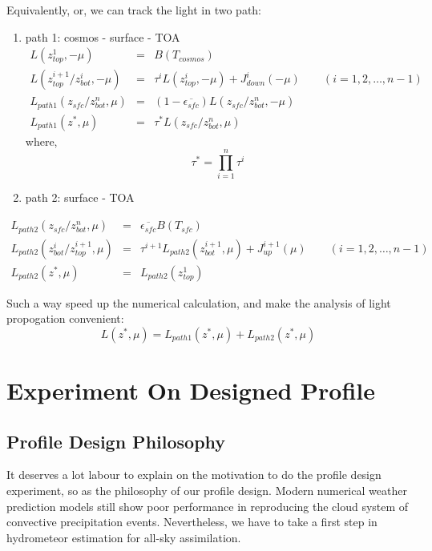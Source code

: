 \documentclass[a4paper]{report}
\begin{document}
Equivalently, or, we can track the light in two path:

\begin{enumerate} \label{eq:path1}
    \item path 1: cosmos - surface - TOA
    \begin{eqnarray}
        L(z_{top}^{1}, -\mu) & = & B(T_{cosmos}) \nonumber\\
        L(z_{top}^{i+1}/z_{bot}^{i}, -\mu) & = & \tau^{i}L(z_{top}^{i}, -\mu) + J_{down}^{i}(-\mu) 
        \qquad (i=1,2, \ldots, n-1) \nonumber\\
        L_{path1}(z_{sfc}/z_{bot}^{n}, \mu) & = & (1-\overline{\epsilon_{sfc}})L(z_{sfc}/z_{bot}^{n}, -\mu) \nonumber\\
        L_{path1}(z^{*}, \mu) & = & \tau^{*}L(z_{sfc}/z_{bot}^{n}, \mu)
    \end{eqnarray}
    where,
    \begin{equation} \label{eq:tau*}
        \tau^{*} = \prod_{i=1}^{n}\tau^{i}
    \end{equation}
    \item path 2: surface - TOA
\end{enumerate}
    \begin{eqnarray} \label{eq:path2}
        L_{path2}(z_{sfc}/z_{bot}^{n}, \mu) & = & \overline{\epsilon_{sfc}}B(T_{sfc}) \nonumber\\
        L_{path2}(z_{bot}^{i}/z_{top}^{i+1}, \mu) & = & \tau^{i+1}L_{path2}(z_{bot}^{i+1}, \mu) + J_{up}^{i+1}(\mu) 
        \qquad (i=1,2, \ldots, n-1) \nonumber\\
        L_{path2}(z^{*}, \mu) & = & L_{path2}(z_{top}^{1})
    \end{eqnarray}

Such a way speed up the numerical calculation, and make the analysis of light propogation convenient:
\begin{equation} \label{eq:path1 and path2}
    L(z^{*}, \mu) = L_{path1}(z^{*}, \mu) + L_{path2}(z^{*}, \mu)
\end{equation}

\chapter{Experiment On Designed Profile}

\section{Profile Design Philosophy}
It deserves a lot labour to explain on the motivation to do the profile design experiment,
so as the philosophy of our profile design. Modern numerical weather prediction models still show
poor performance in reproducing the cloud system of convective precipitation events. 
Nevertheless, we have to take a first step in hydrometeor estimation for all-sky assimilation.
\end{document}
